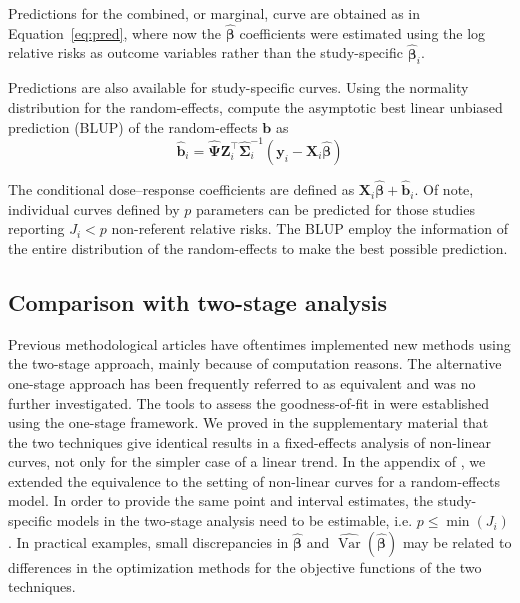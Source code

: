 \documentclass[11pt,a4paper,twoside,openany]{book}\usepackage{knitr}
\DeclareMathOperator{\Var}{Var}
\begin{document}
{Predictions for the combined, or marginal, curve are obtained as in Equation~\ref{eq:pred}, where now the $\boldsymbol{\hat \beta}$ coefficients were estimated using the log relative risks as outcome variables rather than the study-specific $\boldsymbol{\hat \beta}_i$. 

\noindent Predictions are also available for study-specific curves. Using the normality distribution for the random-effects, \cite{henderson1959estimation} compute the asymptotic best linear unbiased prediction (BLUP) of the random-effects $\boldsymbol{b}$ as
\begin{equation}
\hat {\mathbf{b}}_i = \hat{\boldsymbol{\Psi}} \mathbf{Z}_i^\top \hat{\boldsymbol{\Sigma}}_i^{-1}\left( \mathbf{y}_i - \mathbf{X}_i\hat{\boldsymbol{\beta}} \right)
\label{eq:blup_os}
\end{equation}

The conditional dose--response coefficients are defined as $\mathbf{X}_i\hat{\boldsymbol{\beta}} + \hat {\mathbf{b}}_i$. Of note, individual curves defined by $p$ parameters can be predicted for those studies reporting $J_i < p$ non-referent relative risks. The BLUP employ the information of the entire distribution of the random-effects to make the best possible prediction.

\subsection{Comparison with two-stage analysis}

Previous methodological articles have oftentimes implemented new methods using the two-stage approach, mainly because of computation reasons. The alternative one-stage approach has been frequently referred to as equivalent and was no further investigated. The tools to assess the goodness-of-fit in  were established using the one-stage framework. We proved in the supplementary material that the two techniques give identical results in a fixed-effects analysis of non-linear curves, not only for the simpler case of a linear trend. In the appendix of , we extended the equivalence to the setting of non-linear curves for a random-effects model. In order to provide the same point and interval estimates, the study-specific models in the two-stage analysis need to be estimable, i.e. $p \le \min(J_i)$. In practical examples, small discrepancies in $\boldsymbol{\hat \beta}$ and $\widehat{\Var} \left( \boldsymbol{\hat \beta} \right)$ may be related to differences in the optimization methods for the objective functions of the two techniques.

}
\end{document}
